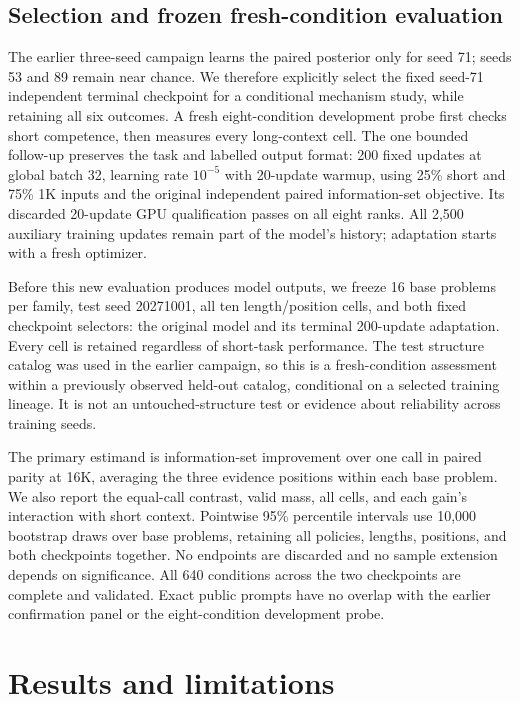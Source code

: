 \documentclass{article}
\begin{document}
\subsection{Selection and frozen fresh-condition evaluation}
The earlier three-seed campaign learns the paired posterior only for seed 71;
seeds 53 and 89 remain near chance. We therefore explicitly select the fixed
seed-71 independent terminal checkpoint for a conditional mechanism study,
while retaining all six outcomes. A fresh eight-condition development probe
first checks short competence, then measures every long-context cell.
The one bounded follow-up preserves the task and labelled output format:
200 fixed updates at global batch 32, learning rate $10^{-5}$ with 20-update
warmup, using 25\% short and 75\% 1K inputs and the original independent paired
information-set objective. Its discarded 20-update GPU qualification passes
on all eight ranks. All 2,500 auxiliary training updates remain part of the
model's history; adaptation starts with a fresh optimizer.

Before this new evaluation produces model outputs, we freeze 16 base problems
per family, test seed 20271001, all ten length/position cells, and both fixed
checkpoint selectors: the original model and its terminal 200-update
adaptation. Every cell is retained regardless of short-task performance.
The test structure catalog was used in the earlier campaign, so this is a
fresh-condition assessment within a previously observed held-out catalog,
conditional on a selected training lineage. It is not an untouched-structure
test or evidence about reliability across training seeds.

The primary estimand is information-set improvement over one call in paired
parity at 16K, averaging the three evidence positions within each base problem.
We also report the equal-call contrast, valid mass, all cells, and each gain's
interaction with short context. Pointwise 95\% percentile intervals use
10,000 bootstrap draws over base problems, retaining all policies, lengths,
positions, and both checkpoints together. No endpoints are discarded and no
sample extension depends on significance. All 640 conditions across the two checkpoints are complete and validated.
Exact public prompts have no overlap with the earlier confirmation panel
or the eight-condition development probe.

\section{Results and limitations}
\end{document}
